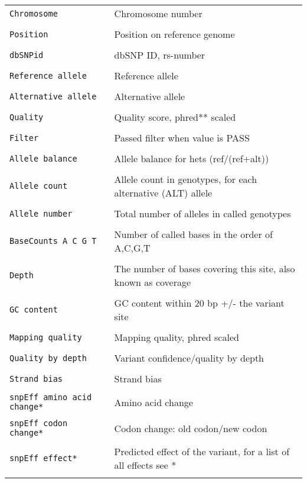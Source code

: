 \documentclass[a4paper,12pt]{article}
\begin{document}
\begin{center}
\begin{longtable}{p{5cm} p{8cm}}
	\tt{Chromosome} & Chromosome number \\\\
	\tt{Position} & Position on reference genome \\\\
	\tt{dbSNPid} & dbSNP ID, rs-number \\\\
	\tt{Reference allele} & Reference allele \\\\
	\tt{Alternative allele} & Alternative allele \\\\
	\tt{Quality} & Quality score, phred** scaled \\\\
	\tt{Filter} & Passed filter when value is PASS \\\\
	\tt{Allele balance} & Allele balance for hets (ref/(ref+alt)) \\\\
	\tt{Allele count} & Allele count in genotypes, for each alternative (ALT) allele \\\\
	\tt{Allele number} & Total number of alleles in called genotypes \\\\
	\tt{BaseCounts A C G T} & Number of called bases in the order of A,C,G,T \\\\
	\tt{Depth} & The number of bases covering this site, also known as coverage \\\\
	\tt{GC content} & GC content within 20 bp +/- the variant site \\\\
	\tt{Mapping quality} & Mapping quality, phred scaled \\\\
	\tt{Quality by depth} & Variant confidence/quality by depth \\\\
	\tt{Strand bias} & Strand bias \\\\
	\tt{snpEff amino acid change*} & Amino acid change \\\\
	\tt{snpEff codon change*} & Codon change: old codon/new codon \\\\
	\tt{snpEff effect*} & Predicted effect of the variant, for a list of all effects see * \\\\

\end{longtable}
\end{center}
\end{document}
